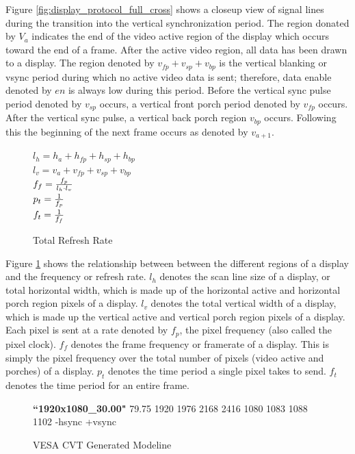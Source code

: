     Figure \ref{fig:display_protocol_full_cross} shows a closeup view of signal lines during the transition into the vertical synchronization period. The region donated by $V_a$ indicates the end of the video active region of the display which occurs toward the end of a frame. After the active video region, all data has been drawn to a display. The region denoted by $v_{fp}+v_{sp}+v_{bp}$ is the vertical blanking or vsync period during which no active video data is sent; therefore, data enable denoted by $en$ is always low during this period. Before the vertical sync pulse period denoted by $v_{sp}$ occurs, a vertical front porch period denoted by $v_{fp}$ occurs. After the vertical sync pulse, a vertical back porch region $v_{bp}$ occurs. Following this the beginning of the next frame occurs as denoted by $v_{a+1}$.
    \begin{figure}
        \centering
        { \Large
            $l_h=h_a+h_{fp}+h_{sp}+h_{bp}$ \vspace{8px} \\
            $l_v=v_a+v_{fp}+v_{sp}+v_{bp}$ \vspace{8px} \\
            $f_f={f_p \over {l_h \cdot l_v}}$ \\
            $p_t={1 \over f_p}$ \vspace{8px} \\
            $f_t={1 \over f_f}$ \vspace{8px}
        }
        \caption{Total Refresh Rate}
        \label{fig:modeline_refresh_rate}
    \end{figure}

    Figure \ref{fig:modeline_refresh_rate} shows the relationship between between the different regions of a display and the frequency or refresh rate. $l_h$ denotes the scan line size of a display, or total horizontal width, which is made up of the horizontal active and horizontal porch region pixels of a display. $l_v$ denotes the total vertical width of a display, which is made up the vertical active and vertical porch region pixels of a display. Each pixel is sent at a rate denoted by $f_p$, the pixel frequency (also called the pixel clock). $f_f$ denotes the frame frequency or framerate of a display. This is simply the pixel frequency over the total number of pixels (video active and porches) of a display. $p_t$ denotes the time period a single pixel takes to send. $f_t$ denotes the time period for an entire frame.

    \begin{figure}
        \centering
        { \normalsize
        \textbf{``1920x1080\_30.00"} {\color{red}79.75}  {\color{blue} 1920 1976 2168 2416}  {\color{darkgreen}1080 1083 1088 1102} {\color{olive}-hsync +vsync}
        }
        \caption{VESA CVT Generated Modeline}
        \label{fig:modeline_example}
    \end{figure}

